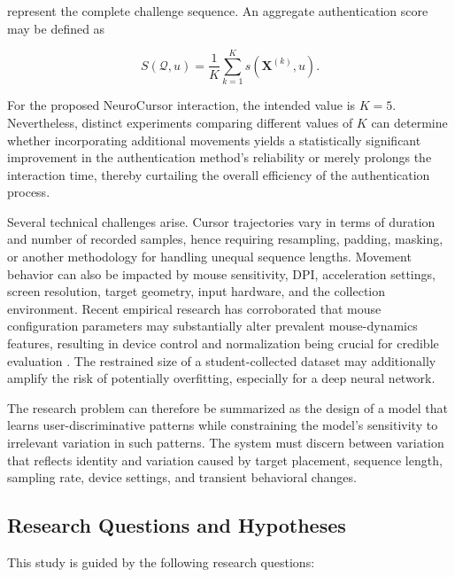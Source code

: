 \documentclass[conference]{IEEEtran}
\begin{document}
represent the complete challenge sequence. An aggregate authentication score may be defined as 

\begin{equation}
S(\mathcal{Q},u)
=
\frac{1}{K}
\sum_{k=1}^K
s\left(\mathbf{X}^{(k)},u\right).
\label{eq:aggregate_score}
\end{equation}

For the proposed NeuroCursor interaction, the intended value is $K=5$. Nevertheless, distinct experiments comparing different values of $K$ can determine whether incorporating additional movements yields a statistically significant improvement in the authentication method's reliability or merely prolongs the interaction time, thereby curtailing the overall efficiency of the authentication process. 

Several technical challenges arise. Cursor trajectories vary in terms of duration and number of recorded samples, hence requiring resampling, padding, masking, or another methodology for handling unequal sequence lengths. Movement behavior can also be impacted by mouse sensitivity, DPI, acceleration settings, screen resolution, target geometry, input hardware, and the collection environment. Recent empirical research has corroborated that mouse configuration parameters may substantially alter prevalent mouse-dynamics features, resulting in device control and normalization being crucial for credible evaluation \cite{kuricMouseCredibility}. The restrained size of a student-collected dataset may additionally amplify the risk of potentially overfitting, especially for a deep neural network. 

The research problem can therefore be summarized as the design of a model that learns user-discriminative patterns while constraining the model's sensitivity to irrelevant variation in such patterns. The system must discern between variation that reflects identity and variation caused by target placement, sequence length, sampling rate, device settings, and transient behavioral changes.

\subsection{Research Questions and Hypotheses}
This study is guided by the following research questions:
\end{document}
